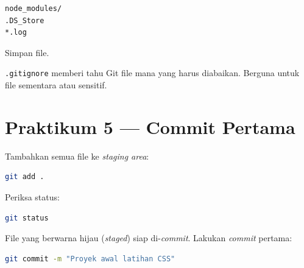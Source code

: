 \begin{lstlisting}[caption={Isi .gitignore}, label={lst:gitignore}]
node_modules/
.DS_Store
*.log
\end{lstlisting}

\begin{langkah}
  \item Simpan file.
\end{langkah}

\begin{catatan}
\texttt{.gitignore} memberi tahu Git file mana yang harus diabaikan. Berguna untuk file sementara atau sensitif.
\end{catatan}

\section{Praktikum 5 --- Commit Pertama}
\label{sec:git-praktik-5}

\begin{langkah}
  \item Tambahkan semua file ke \emph{staging area}:
\end{langkah}

\begin{lstlisting}[language=bash, caption={Menambahkan file ke staging area}, label={lst:git-add}]
git add .
\end{lstlisting}

\begin{langkah}
  \item Periksa status:
\end{langkah}

\begin{lstlisting}[language=bash, caption={Memeriksa status setelah git add}, label={lst:git-status-2}]
git status
\end{lstlisting}

\begin{langkah}
  \item File yang berwarna hijau (\emph{staged}) siap di-\emph{commit}. Lakukan \emph{commit} pertama:
\end{langkah}

\begin{lstlisting}[language=bash, caption={Commit pertama}, label={lst:git-commit}]
git commit -m "Proyek awal latihan CSS"
\end{lstlisting}


